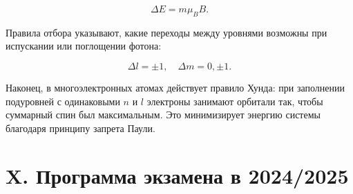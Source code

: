 \documentclass[12pt]{article}
\begin{document}
$$
\Delta E = m \mu_B B.
$$

Правила отбора указывают, какие переходы между уровнями возможны при испускании или поглощении фотона:

$$
\Delta l = \pm 1, \quad \Delta m = 0, \pm 1.
$$

Наконец, в многоэлектронных атомах действует правило Хунда: при заполнении подуровней с одинаковыми $n$ и $l$ электроны занимают орбитали так, чтобы суммарный спин был максимальным. Это минимизирует энергию системы благодаря принципу запрета Паули.


\clearpage

\section{X. Программа экзамена в 2024/2025}
\end{document}
